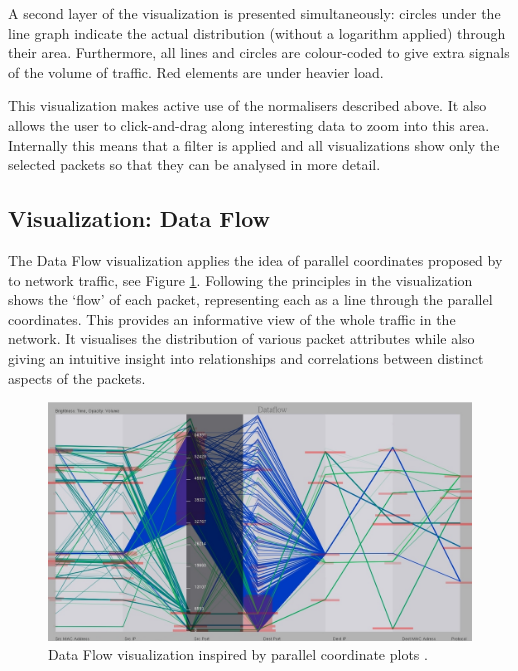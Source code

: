 A second layer of the visualization is presented simultaneously: circles under the line graph
indicate the actual distribution (without a logarithm applied) through their area. Furthermore, all
lines and circles are colour-coded to give extra signals of the volume of traffic. Red elements are
under heavier load.

This visualization makes active use of the normalisers described above. It also allows the user to
click-and-drag along interesting data to zoom into this area. Internally this means that a filter is
applied and all visualizations show only the selected packets so that they can be analysed in more
detail.

\subsection{Visualization: Data Flow}
%
The Data Flow visualization applies the idea of parallel coordinates proposed by
\cite{inselberg1985plane} to network traffic, see Figure \ref{fig:dataflow}. Following the
principles in \cite{fliggnetwork} the visualization shows the `flow' of each packet, representing
each as a line through the parallel coordinates. This provides an informative view of the whole
traffic in the network. It visualises the distribution of various packet attributes while also
giving an intuitive insight into relationships and correlations between distinct aspects of the
packets. 

\begin{figure}[htb]
   \centering
   \includegraphics[width=\linewidth]{materials/dataflow.jpg}
   \caption[Data Flow]{\label{fig:dataflow}
         Data Flow visualization inspired by parallel coordinate plots \cite{inselberg1985plane}.}
\end{figure}


